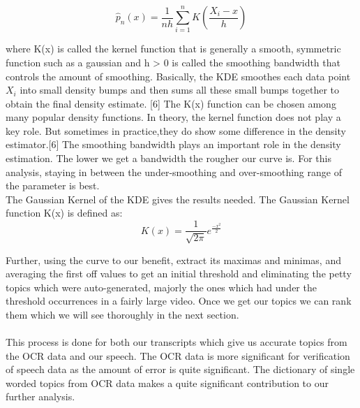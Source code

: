 \documentclass[conference]{IEEEtran}
\begin{document}
$$ \hat{p}_{n}(x) = \frac{1}{nh}\sum\limits_{i=1}^n K(\frac{X_{i}-x}{h})$$

\indent where K(x) is called the kernel function that is generally a smooth, symmetric function such as a gaussian and h > 0 is called the smoothing bandwidth that controls the amount of smoothing. Basically, the KDE smoothes each data point $X_{i}$ into small density bumps and then sums all these small bumps together to obtain the final density estimate. [6] The K(x) function can be chosen among many popular density functions. In theory, the kernel function does not play a key role. But sometimes in practice,they do show some difference in the density estimator.[6] The smoothing bandwidth plays an important role in the density estimation. The lower we get a bandwidth the rougher our curve is. For this analysis, staying in between the under-smoothing and over-smoothing range of the parameter is best.\\
\indent	The Gaussian Kernel of the KDE gives the results needed. The Gaussian Kernel function K(x) is defined as:
$$K(x) = \frac{1}{\sqrt{2\pi}}e^\frac{-x^2}{2}$$

\indent Further, using the curve to our benefit, extract its maximas and minimas, and averaging the first off values to get an initial threshold and eliminating the petty topics which were auto-generated, majorly the ones which had under the threshold occurrences in a fairly large video. Once we get our topics we can rank them which we will see thoroughly in the next section.\\
\\
This process is done for both our transcripts which give us accurate topics from the OCR data and our speech. The OCR data is more significant for verification of speech data as the amount of error is quite significant. The dictionary of single worded topics from OCR data makes a quite significant contribution to our further analysis.
\end{document}

